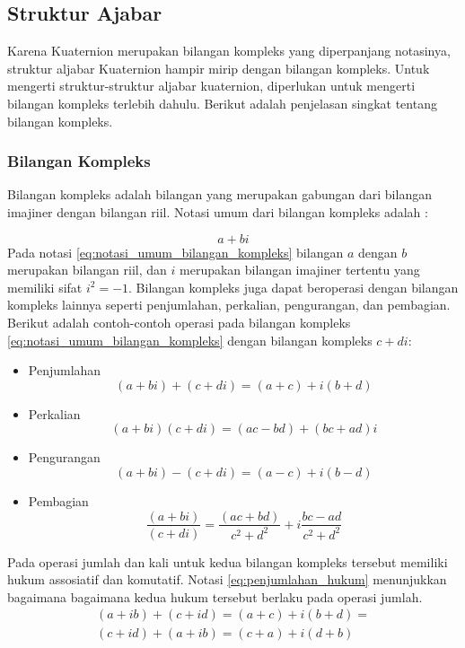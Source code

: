 \subsection{Struktur Ajabar}
Karena Kuaternion merupakan bilangan kompleks yang diperpanjang notasinya, struktur aljabar Kuaternion hampir mirip dengan bilangan kompleks. Untuk mengerti struktur-struktur aljabar kuaternion, diperlukan untuk mengerti  bilangan kompleks terlebih dahulu. Berikut adalah penjelasan singkat tentang bilangan kompleks. 


\subsubsection{Bilangan Kompleks}
\label{sssec:bilangan_kompleks}
Bilangan kompleks adalah bilangan yang merupakan gabungan dari bilangan imajiner dengan bilangan riil. Notasi umum dari bilangan kompleks adalah :

\begin{equation}
	a+bi
\label{eq:notasi_umum_bilangan_kompleks}
\end{equation}
Pada notasi \ref{eq:notasi_umum_bilangan_kompleks} bilangan \(a\) dengan \(b\) merupakan bilangan riil, dan \(i\) merupakan bilangan imajiner tertentu yang memiliki sifat \(i^2=-1\). Bilangan kompleks juga dapat beroperasi dengan bilangan kompleks lainnya seperti penjumlahan, perkalian, pengurangan, dan pembagian. Berikut adalah contoh-contoh operasi pada bilangan kompleks \ref{eq:notasi_umum_bilangan_kompleks} dengan bilangan kompleks \(c+di\):
\begin{itemize}
	\item Penjumlahan\\
	\[
	 (a + bi) + (c + di) = (a+c) + i(b+d)
	\]
	\item Perkalian\\
	\[
	 (a + bi)(c + di) = (ac−bd) + (bc+ad)i
	\]
	\item Pengurangan\\
	\[
	 (a + bi) - (c + di) = (a-c) + i(b-d)
	\]
	\item Pembagian\\
	\[
	 \frac{(a + bi)}{(c + di)} = \frac{(ac+bd)}{c^2+d^2} + i \frac{bc-ad}{c^2+d^2}
	\]
\end{itemize}
Pada operasi jumlah dan kali untuk kedua bilangan kompleks tersebut memiliki hukum assosiatif dan komutatif. Notasi \ref{eq:penjumlahan_hukum} menunjukkan bagaimana bagaimana kedua hukum tersebut berlaku pada operasi jumlah.
\begin{equation}
	\begin{split}
	(a+ib) + (c+id) = (a+c) + i(b+d)=\\
	(c+id) + (a+ib) = (c+a) + i(d+b)
	\end{split}
\label{eq:penjumlahan_hukum}
\end{equation}

